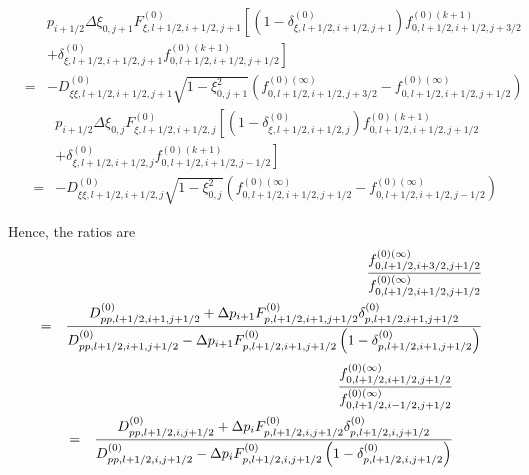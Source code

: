 \begin{eqnarray}
&&p_{i+1/2}\Delta \xi _{0,j+1}F_{\xi ,l+1/2,i+1/2,j+1}^{\left( 0\right)
}\left[ \left( 1-\delta _{\xi ,l+1/2,i+1/2,j+1}^{\left( 0\right) }\right)
f_{0,l+1/2,i+1/2,j+3/2}^{\left( 0\right) (k+1)}\right.  \nonumber \\
&&\left. +\delta _{\xi ,l+1/2,i+1/2,j+1}^{\left( 0\right)
}f_{0,l+1/2,i+1/2,j+1/2}^{\left( 0\right) (k+1)}\right]  \nonumber \\
&=&-D_{\xi \xi ,l+1/2,i+1/2,j+1}^{\left( 0\right) }\sqrt{1-\xi _{0,j+1}^{2}}
\left( f_{0,l+1/2,i+1/2,j+3/2}^{\left( 0\right) (\infty
)}-f_{0,l+1/2,i+1/2,j+1/2}^{\left( 0\right) (\infty )}\right)
\end{eqnarray}
\begin{eqnarray}
&&p_{i+1/2}\Delta \xi _{0,j}F_{\xi ,l+1/2,i+1/2,j}^{\left( 0\right) }\left[
\left( 1-\delta _{\xi ,l+1/2,i+1/2,j}^{\left( 0\right) }\right)
f_{0,l+1/2,i+1/2,j+1/2}^{\left( 0\right) (k+1)}\right.  \nonumber \\
&&\left. +\delta _{\xi ,l+1/2,i+1/2,j}^{\left( 0\right)
}f_{0,l+1/2,i+1/2,j-1/2}^{\left( 0\right) (k+1)}\right]  \nonumber \\
&=&-D_{\xi \xi ,l+1/2,i+1/2,j}^{\left( 0\right) }\sqrt{1-\xi _{0,j}^{2}}%
\left( f_{0,l+1/2,i+1/2,j+1/2}^{\left( 0\right) (\infty
)}-f_{0,l+1/2,i+1/2,j-1/2}^{\left( 0\right) (\infty )}\right)
\end{eqnarray}

Hence, the ratios are
\begin{eqnarray}
&&\frac{f_{0,l+1/2,i+3/2,j+1/2}^{\left( 0\right) (\infty )}}{%
f_{0,l+1/2,i+1/2,j+1/2}^{\left( 0\right) (\infty )}}  \nonumber \\
&=&\frac{D_{pp,l+1/2,i+1,j+1/2}^{\left( 0\right) }+\Delta
p_{i+1}F_{p,l+1/2,i+1,j+1/2}^{\left( 0\right) }\delta
_{p,l+1/2,i+1,j+1/2}^{\left( 0\right) }}{D_{pp,l+1/2,i+1,j+1/2}^{\left(
0\right) }-\Delta p_{i+1}F_{p,l+1/2,i+1,j+1/2}^{\left( 0\right) }\left(
1-\delta _{p,l+1/2,i+1,j+1/2}^{\left( 0\right) }\right) }
\end{eqnarray}
\begin{eqnarray}
&&\frac{f_{0,l+1/2,i+1/2,j+1/2}^{\left( 0\right) (\infty )}}{%
f_{0,l+1/2,i-1/2,j+1/2}^{\left( 0\right) (\infty )}}  \nonumber \\
&=&\frac{D_{pp,l+1/2,i,j+1/2}^{\left( 0\right) }+\Delta
p_{i}F_{p,l+1/2,i,j+1/2}^{\left( 0\right) }\delta _{p,l+1/2,i,j+1/2}^{\left(
0\right) }}{D_{pp,l+1/2,i,j+1/2}^{\left( 0\right) }-\Delta
p_{i}F_{p,l+1/2,i,j+1/2}^{\left( 0\right) }\left( 1-\delta
_{p,l+1/2,i,j+1/2}^{\left( 0\right) }\right) }
\end{eqnarray}

